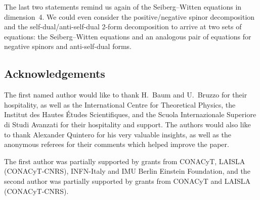 \documentclass[10pt,a4paper]{amsart}
\numberwithin{equation}{section}
\begin{document}
\begin{Remark} The last two statements remind us again of the Seiberg--Witten equations in dimension~4. We could even consider the positive/negative spinor decomposition and the self-dual/anti-self-dual 2-form decomposition to arrive at two sets of equations: the Seiberg--Witten equations and an analogous pair of equations for negative spinors and anti-self-dual forms.
\end{Remark}

\subsection*{Acknowledgements}

The first named author would like to thank H.~Baum and U.~Bruzzo for their hospitality, as well as the International Centre for Theoretical Physics, the Institut des Hautes \'Etudes Scientifiques, and the Scuola Internazionale Superiore di Studi Avanzati for their hospitality and support. The authors would also like to thank Alexander Quintero for his very valuable insights, as well as the anonymous referees for their comments which helped
improve the paper.

The first author was partially supported by grants from CONACyT, LAISLA (CONACyT-CNRS), INFN-Italy and IMU Berlin Einstein Foundation, and the second author was partially supported by grants from CONACyT and LAISLA (CONACyT-CNRS).

\end{document}
